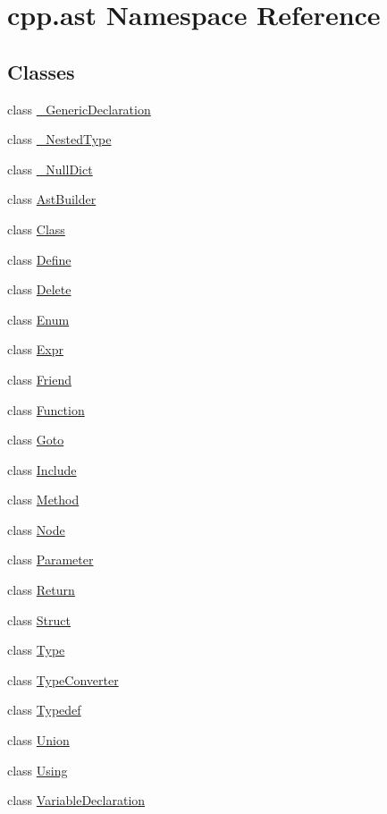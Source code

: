 \hypertarget{namespacecpp_1_1ast}{}\section{cpp.\+ast Namespace Reference}
\label{namespacecpp_1_1ast}
\subsection*{Classes}
\begin{DoxyCompactItemize}
\item 
class \hyperlink{classcpp_1_1ast_1_1__GenericDeclaration}{\+\_\+\+Generic\+Declaration}
\item 
class \hyperlink{classcpp_1_1ast_1_1__NestedType}{\+\_\+\+Nested\+Type}
\item 
class \hyperlink{classcpp_1_1ast_1_1__NullDict}{\+\_\+\+Null\+Dict}
\item 
class \hyperlink{classcpp_1_1ast_1_1AstBuilder}{Ast\+Builder}
\item 
class \hyperlink{classcpp_1_1ast_1_1Class}{Class}
\item 
class \hyperlink{classcpp_1_1ast_1_1Define}{Define}
\item 
class \hyperlink{classcpp_1_1ast_1_1Delete}{Delete}
\item 
class \hyperlink{classcpp_1_1ast_1_1Enum}{Enum}
\item 
class \hyperlink{classcpp_1_1ast_1_1Expr}{Expr}
\item 
class \hyperlink{classcpp_1_1ast_1_1Friend}{Friend}
\item 
class \hyperlink{classcpp_1_1ast_1_1Function}{Function}
\item 
class \hyperlink{classcpp_1_1ast_1_1Goto}{Goto}
\item 
class \hyperlink{classcpp_1_1ast_1_1Include}{Include}
\item 
class \hyperlink{classcpp_1_1ast_1_1Method}{Method}
\item 
class \hyperlink{classcpp_1_1ast_1_1Node}{Node}
\item 
class \hyperlink{classcpp_1_1ast_1_1Parameter}{Parameter}
\item 
class \hyperlink{classcpp_1_1ast_1_1Return}{Return}
\item 
class \hyperlink{classcpp_1_1ast_1_1Struct}{Struct}
\item 
class \hyperlink{classcpp_1_1ast_1_1Type}{Type}
\item 
class \hyperlink{classcpp_1_1ast_1_1TypeConverter}{Type\+Converter}
\item 
class \hyperlink{classcpp_1_1ast_1_1Typedef}{Typedef}
\item 
class \hyperlink{classcpp_1_1ast_1_1Union}{Union}
\item 
class \hyperlink{classcpp_1_1ast_1_1Using}{Using}
\item 
class \hyperlink{classcpp_1_1ast_1_1VariableDeclaration}{Variable\+Declaration}
\end{DoxyCompactItemize}
